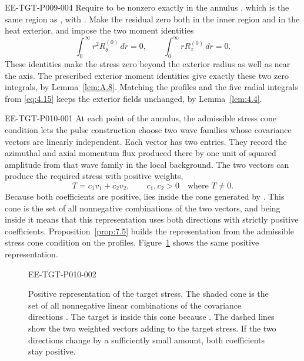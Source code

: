 \begin{EESegment}{EE-TGT-P009-004}
Require  to be nonzero exactly in the annulus
, which is the same region as
, with
. Make the residual zero both in the inner region and in the heat
exterior, and impose the two moment identities
\[
 \int_0^\infty r^2R_\theta^{(0)}\,dr=0,
 \qquad
 \int_0^\infty rR_z^{(0)}\,dr=0.
\]
These identities make the stress zero beyond the exterior radius as well as near the axis. The
prescribed exterior moment identities give exactly these two zero integrals, by
Lemma~\ref{lem:A.8}. Matching the profiles and the five radial integrals from \eqref{eq:4.15}
keeps the exterior fields unchanged, by Lemma~\ref{lem:4.4}.
\end{EESegment}

%
\begin{EESegment}{EE-TGT-P010-001}
At each point of the annulus, the admissible stress cone condition lets the pulse construction
choose two wave families whose covariance vectors
 are linearly independent. Each vector has two entries.
They record the azimuthal and axial momentum flux produced there by one unit of squared amplitude
from that wave family in the local background. The two vectors can produce the required stress
with positive weights,
\[
 T=c_1v_1+c_2v_2,\qquad c_1,c_2>0\quad\text{where }T\neq0.
\]
Because both coefficients are positive,  lies inside the cone generated by
. This cone is the set of all nonnegative combinations of the two
vectors, and being inside it means that this representation uses both directions with strictly
positive coefficients. Proposition~\ref{prop:7.5} builds the representation from the admissible
stress cone condition on the profiles. Figure~\ref{fig:4} shows the same positive representation.
\end{EESegment}

\begin{figure}[htbp]
 \centering
 \begin{EESegment}{EE-TGT-P010-002}
 \caption{Positive representation of the target stress. The shaded cone is the set of all
 nonnegative linear combinations of the covariance directions
 . The target
  is inside this cone because
 . The dashed lines show the two weighted vectors adding to
 the target stress. If the two directions change by a sufficiently small amount, both coefficients stay
 positive.}
 \label{fig:4}
 \end{EESegment}
\end{figure}

